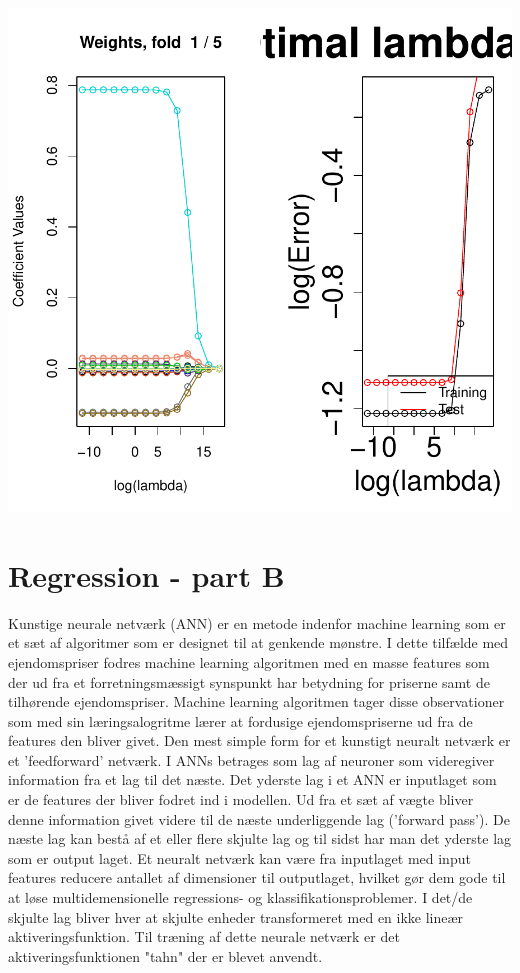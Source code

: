 \documentclass{report}
\begin{document}
\includegraphics{rapport_latex-009}


\section{Regression - part B}

Kunstige neurale netværk (ANN) er en metode indenfor machine learning som er et sæt af algoritmer som er designet til at genkende mønstre. I dette tilfælde med ejendomspriser fodres machine learning algoritmen med en masse features som der ud fra et forretningsmæssigt synspunkt har betydning for priserne samt de tilhørende ejendomspriser. Machine learning algoritmen tager disse observationer som med sin læringsalogritme lærer at fordusige ejendomspriserne ud fra de features den bliver givet. 
Den mest simple form for et kunstigt neuralt netværk er et 'feedforward' netværk. I ANNs betrages som lag af neuroner som videregiver information fra et lag til det næste. Det yderste lag i et ANN er inputlaget som er de features der bliver fodret ind i modellen. Ud fra et sæt af vægte bliver denne information givet videre til de næste underliggende lag ('forward pass'). De næste lag kan bestå af et eller flere skjulte lag og til sidst har man det yderste lag som er output laget. 
Et neuralt netværk kan være fra inputlaget med input features reducere antallet af dimensioner til outputlaget, hvilket gør dem gode til at løse multidemensionelle regressions- og klassifikationsproblemer. 
I det/de skjulte lag bliver hver at skjulte enheder transformeret med en ikke lineær aktiveringsfunktion. Til træning af dette neurale netværk er det aktiveringsfunktionen "tahn" der er blevet anvendt. 
\end{document}
